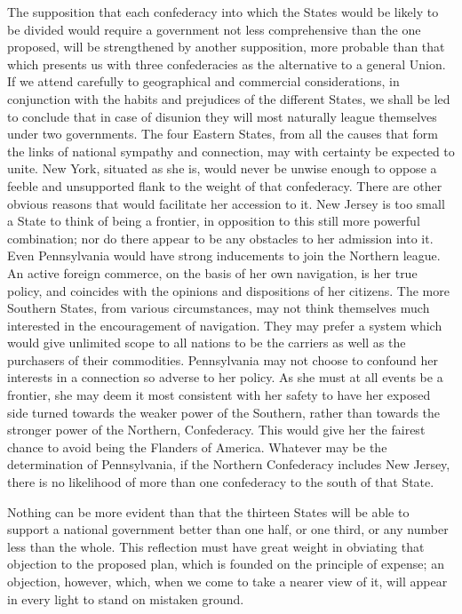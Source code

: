 The supposition that each confederacy into which the States would be likely to be divided would require a government not less comprehensive than the one proposed, will be strengthened by another supposition, more probable than that which presents us with three confederacies as the alternative to a general Union. If we attend carefully to geographical and commercial considerations, in conjunction with the habits and prejudices of the different States, we shall be led to conclude that in case of disunion they will most naturally league themselves under two governments. The four Eastern States, from all the causes that form the links of national sympathy and connection, may with certainty be expected to unite. New York, situated as she is, would never be unwise enough to oppose a feeble and unsupported flank to the weight of that confederacy. There are other obvious reasons that would facilitate her accession to it. New Jersey is too small a State to think of being a frontier, in opposition to this still more powerful combination; nor do there appear to be any obstacles to her admission into it. Even Pennsylvania would have strong inducements to join the Northern league. An active foreign commerce, on the basis of her own navigation, is her true policy, and coincides with the opinions and dispositions of her citizens. The more Southern States, from various circumstances, may not think themselves much interested in the encouragement of navigation. They may prefer a system which would give unlimited scope to all nations to be the carriers as well as the purchasers of their commodities. Pennsylvania may not choose to confound her interests in a connection so adverse to her policy. As she must at all events be a frontier, she may deem it most consistent with her safety to have her exposed side turned towards the weaker power of the Southern, rather than towards the stronger power of the Northern, Confederacy. This would give her the fairest chance to avoid being the Flanders of America. Whatever may be the determination of Pennsylvania, if the Northern Confederacy includes New Jersey, there is no likelihood of more than one confederacy to the south of that State.

Nothing can be more evident than that the thirteen States will be able to support a national government better than one half, or one third, or any number less than the whole. This reflection must have great weight in obviating that objection to the proposed plan, which is founded on the principle of expense; an objection, however, which, when we come to take a nearer view of it, will appear in every light to stand on mistaken ground.

